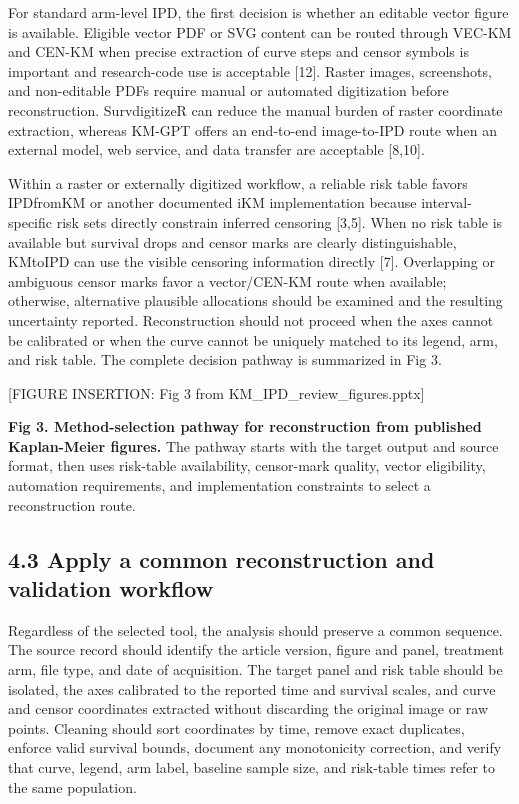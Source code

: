 \documentclass[
  english,
  letterpaper,
  DIV=11,
  numbers=noendperiod]{scrartcl}
\begin{document}
For standard arm-level IPD, the first decision is whether an editable
vector figure is available. Eligible vector PDF or SVG content can be
routed through VEC-KM and CEN-KM when precise extraction of curve steps
and censor symbols is important and research-code use is acceptable
{[}12{]}. Raster images, screenshots, and non-editable PDFs require
manual or automated digitization before reconstruction. SurvdigitizeR
can reduce the manual burden of raster coordinate extraction, whereas
KM-GPT offers an end-to-end image-to-IPD route when an external model,
web service, and data transfer are acceptable {[}8,10{]}.

Within a raster or externally digitized workflow, a reliable risk table
favors IPDfromKM or another documented iKM implementation because
interval-specific risk sets directly constrain inferred censoring
{[}3,5{]}. When no risk table is available but survival drops and censor
marks are clearly distinguishable, KMtoIPD can use the visible censoring
information directly {[}7{]}. Overlapping or ambiguous censor marks
favor a vector/CEN-KM route when available; otherwise, alternative
plausible allocations should be examined and the resulting uncertainty
reported. Reconstruction should not proceed when the axes cannot be
calibrated or when the curve cannot be uniquely matched to its legend,
arm, and risk table. The complete decision pathway is summarized in Fig
3.

{[}FIGURE INSERTION: Fig 3 from KM\_IPD\_review\_figures.pptx{]}

\textbf{Fig 3. Method-selection pathway for reconstruction from
published Kaplan-Meier figures.} The pathway starts with the target
output and source format, then uses risk-table availability, censor-mark
quality, vector eligibility, automation requirements, and implementation
constraints to select a reconstruction route.

\subsection{4.3 Apply a common reconstruction and validation
workflow}\label{apply-a-common-reconstruction-and-validation-workflow}

Regardless of the selected tool, the analysis should preserve a common
sequence. The source record should identify the article version, figure
and panel, treatment arm, file type, and date of acquisition. The target
panel and risk table should be isolated, the axes calibrated to the
reported time and survival scales, and curve and censor coordinates
extracted without discarding the original image or raw points. Cleaning
should sort coordinates by time, remove exact duplicates, enforce valid
survival bounds, document any monotonicity correction, and verify that
curve, legend, arm label, baseline sample size, and risk-table times
refer to the same population.
\end{document}
